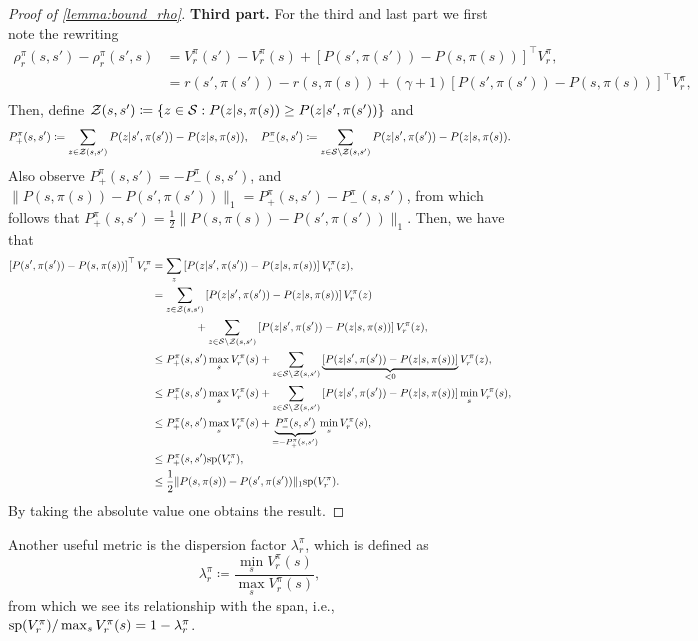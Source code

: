\begin{proof}[Proof of \cref{lemma:bound_rho}]
{\bf Third part.} For the third and last part we first note the rewriting 
\begin{align*}
\rho_r^\pi(s,s') -\rho_r^\pi(s',s)  &=V_r^\pi(s')-V_r^\pi(s)+ \left[P(s',\pi(s')) -P(s,\pi(s)) \right]^\top V_r^\pi,\\
&=r(s',\pi(s'))-r(s,\pi(s)) + (\gamma+1)\left[P(s',\pi(s')) -P(s,\pi(s)) \right]^\top V_r^\pi,\\
\end{align*}
Then, define ${\cal Z}(s,s') \coloneqq \{z\in{\cal S}: P(z|s,\pi(s)) \geq P(z|s',\pi(s'))\}$ and
\[
P_+^\pi(s,s') \coloneqq \sum_{z \in {\cal Z}(s,s')} P(z|s',\pi(s')) - P(z|s,\pi(s)),\quad P_-^\pi(s,s') \coloneqq \sum_{z \in {\cal S}\setminus {\cal Z}(s,s')} P(z|s',\pi(s')) - P(z|s,\pi(s)).
\]
Also observe $P_+^\pi(s,s')=-P_-^\pi(s,s')$, and $\|P(s,\pi(s)) - P(s',\pi(s'))\|_1= P_+^\pi(s,s')- P_-^\pi(s,s')$, from which follows that $P_+^\pi(s,s')=\frac{1}{2}\|P(s,\pi(s)) - P(s',\pi(s'))\|_1$.
Then, we have that
\begin{align*}
    \left[P(s',\pi(s')) -P(s,\pi(s)) \right]^\top V_r^\pi &= \sum_{z} \left[P(z|s',\pi(s')) - P(z|s,\pi(s))\right]V_r^\pi(z),\\
    &=\sum_{z\in {\cal Z}(s,s')} \left[P(z|s',\pi(s')) - P(z|s,\pi(s))\right]V_r^\pi(z) \\&\qquad\qquad+ \sum_{z\in {\cal S}\setminus{\cal Z}(s,s')} \left[P(z|s',\pi(s')) - P(z|s,\pi(s))\right]V_r^\pi(z),\\
    &\leq P_+^\pi(s,s') \max_s V_r^\pi(s) + \sum_{z\in {\cal S}\setminus{\cal Z}(s,s')} \underbrace{\left[P(z|s',\pi(s')) - P(z|s,\pi(s))\right]}_{<0}V_r^\pi(z),\\
    &\leq P_+^\pi(s,s') \max_s V_r^\pi(s) + \sum_{z\in {\cal S}\setminus{\cal Z}(s,s')} \left[P(z|s',\pi(s')) - P(z|s,\pi(s))\right]\min_s V_r^\pi(s),\\
    &\leq P_+^\pi(s,s') \max_s V_r^\pi(s) + \underbrace{P_-^\pi(s,s')}_{=-P_+^\pi(s,s')}\min_s V_r^\pi(s),\\
    &\leq P_+^\pi(s,s') {\rm sp}(V_r^\pi),\\
    &\leq \frac{1}{2}\|P(s,\pi(s)) - P(s',\pi(s'))\|_1{\rm sp}(V_r^\pi).
\end{align*}
By taking the absolute value one obtains the result.
\end{proof}


Another useful metric is the dispersion factor $\lambda_r^\pi$, which is defined as 
\[
\lambda_r^\pi \coloneqq \frac{\min_{s} V_r^\pi(s)}{\max_s V_r^\pi(s)},
\]
from which we see its relationship with the span, i.e., ${\rm sp}(V_r^\pi)/\max_s V_r^\pi(s) = 1- \lambda_r^\pi$.

